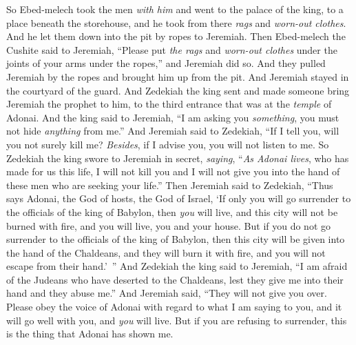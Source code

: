 \begin{biblechapter}
\verse So Ebed-melech took the men \textit{with him} and went to the palace of the king, to a place beneath the storehouse, and he took from there \textit{rags} and \textit{worn-out clothes}. And he let them down into the pit by ropes to Jeremiah.
\verse Then Ebed-melech the Cushite said to Jeremiah, “Please put \textit{the rags} and \textit{worn-out clothes} under the joints of your arms under the ropes,” and Jeremiah did so.
\verse And they pulled Jeremiah by the ropes and brought him up from the pit. And Jeremiah stayed in the courtyard of the guard.
\verse And Zedekiah the king sent and made someone bring Jeremiah the prophet to him, to the third entrance that was at the \textit{temple} of Adonai. And the king said to Jeremiah, “I am asking you \textit{something}, you must not hide \textit{anything} from me.”
\verse And Jeremiah said to Zedekiah, “If I tell you, will you not surely kill me? \textit{Besides}, if I advise you, you will not listen to me.
\verse So Zedekiah the king swore to Jeremiah in secret, \textit{saying}, “\textit{As Adonai lives}, who has made for us this life, I will not kill you and I will not give you into the hand of these men who are seeking your life.”
\verse Then Jeremiah said to Zedekiah, “Thus says Adonai, the God of hosts, the God of Israel, ‘If only you will go surrender to the officials of the king of Babylon, then \textit{you} will live, and this city will not be burned with fire, and you will live, you and your house.
\verse But if you do not go surrender to the officials of the king of Babylon, then this city will be given into the hand of the Chaldeans, and they will burn it with fire, and you will not escape from their hand.’ ”
\verse And Zedekiah the king said to Jeremiah, “I am afraid of the Judeans who have deserted to the Chaldeans, lest they give me into their hand and they abuse me.”
\verse And Jeremiah said, “They will not give you over. Please obey the voice of Adonai with regard to what I am saying to you, and it will go well with you, and \textit{you} will live.
\verse But if you are refusing to surrender, this is the thing that Adonai has shown me.

\end{biblechapter}
